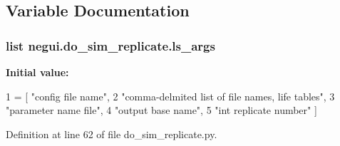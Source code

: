 \subsection{Variable Documentation}
\subsubsection[{\texorpdfstring{ls\+\_\+args}{ls_args}}]{\setlength{\rightskip}{0pt plus 5cm}list negui.\+do\+\_\+sim\+\_\+replicate.\+ls\+\_\+args}\hypertarget{namespacenegui_1_1do__sim__replicate_a4f27c21f7d1ce47ac596308f2eb43207}{}\label{namespacenegui_1_1do__sim__replicate_a4f27c21f7d1ce47ac596308f2eb43207}
{\bfseries Initial value\+:}
\begin{DoxyCode}
1 = [ \textcolor{stringliteral}{"config file name"}, 
2                 \textcolor{stringliteral}{"comma-delmited list of file names, life tables"},
3                 \textcolor{stringliteral}{"parameter name file"},
4                 \textcolor{stringliteral}{"output base name"},
5                 \textcolor{stringliteral}{"int replicate number"} ]
\end{DoxyCode}


Definition at line 62 of file do\+\_\+sim\+\_\+replicate.\+py.

